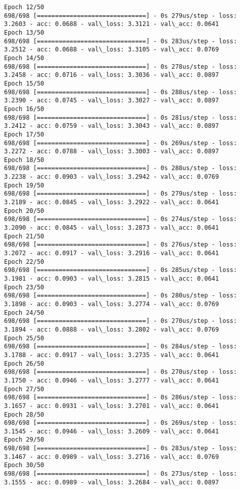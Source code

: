 \documentclass[11pt]{article}
\begin{document}
\begin{Verbatim}[commandchars=\\\{\}]
Epoch 12/50
698/698 [==============================] - 0s 279us/step - loss: 3.2603 - acc: 0.0688 - val\_loss: 3.3121 - val\_acc: 0.0641
Epoch 13/50
698/698 [==============================] - 0s 283us/step - loss: 3.2512 - acc: 0.0688 - val\_loss: 3.3105 - val\_acc: 0.0769
Epoch 14/50
698/698 [==============================] - 0s 278us/step - loss: 3.2458 - acc: 0.0716 - val\_loss: 3.3036 - val\_acc: 0.0897
Epoch 15/50
698/698 [==============================] - 0s 288us/step - loss: 3.2390 - acc: 0.0745 - val\_loss: 3.3027 - val\_acc: 0.0897
Epoch 16/50
698/698 [==============================] - 0s 281us/step - loss: 3.2412 - acc: 0.0759 - val\_loss: 3.3043 - val\_acc: 0.0897
Epoch 17/50
698/698 [==============================] - 0s 269us/step - loss: 3.2272 - acc: 0.0788 - val\_loss: 3.3003 - val\_acc: 0.0897
Epoch 18/50
698/698 [==============================] - 0s 288us/step - loss: 3.2238 - acc: 0.0903 - val\_loss: 3.2942 - val\_acc: 0.0769
Epoch 19/50
698/698 [==============================] - 0s 279us/step - loss: 3.2189 - acc: 0.0845 - val\_loss: 3.2922 - val\_acc: 0.0641
Epoch 20/50
698/698 [==============================] - 0s 274us/step - loss: 3.2090 - acc: 0.0845 - val\_loss: 3.2873 - val\_acc: 0.0641
Epoch 21/50
698/698 [==============================] - 0s 276us/step - loss: 3.2072 - acc: 0.0917 - val\_loss: 3.2916 - val\_acc: 0.0641
Epoch 22/50
698/698 [==============================] - 0s 285us/step - loss: 3.1981 - acc: 0.0903 - val\_loss: 3.2815 - val\_acc: 0.0641
Epoch 23/50
698/698 [==============================] - 0s 280us/step - loss: 3.1898 - acc: 0.0903 - val\_loss: 3.2774 - val\_acc: 0.0769
Epoch 24/50
698/698 [==============================] - 0s 270us/step - loss: 3.1894 - acc: 0.0888 - val\_loss: 3.2802 - val\_acc: 0.0769
Epoch 25/50
698/698 [==============================] - 0s 284us/step - loss: 3.1788 - acc: 0.0917 - val\_loss: 3.2735 - val\_acc: 0.0641
Epoch 26/50
698/698 [==============================] - 0s 270us/step - loss: 3.1750 - acc: 0.0946 - val\_loss: 3.2777 - val\_acc: 0.0641
Epoch 27/50
698/698 [==============================] - 0s 286us/step - loss: 3.1657 - acc: 0.0931 - val\_loss: 3.2701 - val\_acc: 0.0641
Epoch 28/50
698/698 [==============================] - 0s 269us/step - loss: 3.1545 - acc: 0.0946 - val\_loss: 3.2609 - val\_acc: 0.0641
Epoch 29/50
698/698 [==============================] - 0s 283us/step - loss: 3.1467 - acc: 0.0989 - val\_loss: 3.2716 - val\_acc: 0.0769
Epoch 30/50
698/698 [==============================] - 0s 273us/step - loss: 3.1555 - acc: 0.0989 - val\_loss: 3.2684 - val\_acc: 0.0897

\end{Verbatim}
\end{document}
